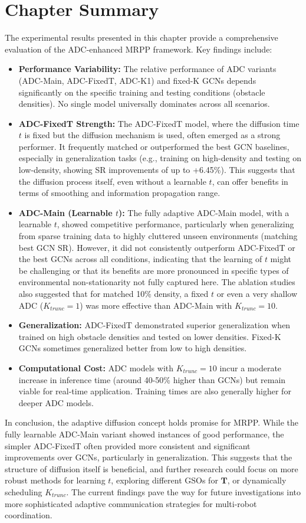 \section{Chapter Summary}
\label{sec:results_summary_detailed}
The experimental results presented in this chapter provide a comprehensive evaluation of the ADC-enhanced MRPP framework.
Key findings include:
\begin{itemize}
    \item \textbf{Performance Variability:} The relative performance of ADC variants (ADC-Main, ADC-FixedT, ADC-K1) and fixed-K GCNs depends significantly on the specific training and testing conditions (obstacle densities). No single model universally dominates across all scenarios.
    \item \textbf{ADC-FixedT Strength:} The ADC-FixedT model, where the diffusion time $t$ is fixed but the diffusion mechanism is used, often emerged as a strong performer. It frequently matched or outperformed the best GCN baselines, especially in generalization tasks (e.g., training on high-density and testing on low-density, showing SR improvements of up to +6.45\%). This suggests that the diffusion process itself, even without a learnable $t$, can offer benefits in terms of smoothing and information propagation range.
    \item \textbf{ADC-Main (Learnable $t$):} The fully adaptive ADC-Main model, with a learnable $t$, showed competitive performance, particularly when generalizing from sparse training data to highly cluttered unseen environments (matching best GCN SR). However, it did not consistently outperform ADC-FixedT or the best GCNs across all conditions, indicating that the learning of $t$ might be challenging or that its benefits are more pronounced in specific types of environmental non-stationarity not fully captured here. The ablation studies also suggested that for matched 10\% density, a fixed $t$ or even a very shallow ADC ($K_{trunc}=1$) was more effective than ADC-Main with $K_{trunc}=10$.
    \item \textbf{Generalization:} ADC-FixedT demonstrated superior generalization when trained on high obstacle densities and tested on lower densities. Fixed-K GCNs sometimes generalized better from low to high densities.
    \item \textbf{Computational Cost:} ADC models with $K_{trunc}=10$ incur a moderate increase in inference time (around 40-50\% higher than GCNs) but remain viable for real-time application. Training times are also generally higher for deeper ADC models.
\end{itemize}
In conclusion, the adaptive diffusion concept holds promise for MRPP. While the fully learnable ADC-Main variant showed instances of good performance, the simpler ADC-FixedT often provided more consistent and significant improvements over GCNs, particularly in generalization. This suggests that the structure of diffusion itself is beneficial, and further research could focus on more robust methods for learning $t$, exploring different GSOs for $\mathbf{T}$, or dynamically scheduling $K_{trunc}$. The current findings pave the way for future investigations into more sophisticated adaptive communication strategies for multi-robot coordination.